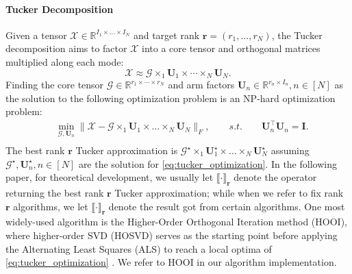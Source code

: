 \paragraph{Tucker Decomposition}
Given a tensor $\mathscr{X}\in\mathbb{R}^{I_1\times \dots \times I_N}$ and target rank $\mathbf{r}=(r_1,\dots, r_N)$, the Tucker decomposition aims to factor $\mathscr{X}$ into a core tensor and orthogonal matrices multiplied along each mode:
\begin{equation}
\label{eq:tucker_optimization}
\mathscr{X} \approx \mathscr{G}\times_1 \mathbf{U}_1 \times \cdots \times_N \mathbf{U}_N.  
\end{equation}
Finding the core tensor $\mathscr{G}\in \mathbb{R}^{r_1 \times \cdots \times r_N}$ and arm factors $\mathbf{U}_n \in \mathbb{R}^{r_n\times I_n}, n\in [N]$ as the solution to the following optimization problem is an NP-hard optimization problem: 
\begin{equation}
\begin{aligned}
\label{eq:tucker_optimization}
&\min_{\mathscr{G}, \mathbf{U}_n}\|\mathscr{X} - \mathscr{G}\times_1 \mathbf{U}_1\times \dots \times_N \mathbf{U}_N\|_F, \qquad s.t. \qquad \mathbf{U}_n^\top \mathbf{U}_n = \mathbf{I}. \\
\end{aligned}
\end{equation}
The best rank $\mathbf{r}$ Tucker approximation is $\mathscr{G}^\star\times_1 \mathbf{U}_1^\star\times \dots \times_N \mathbf{U}_N^\star$ assuming $\mathscr{G}^\star, \mathbf{U}_n^\star, n\in [N]$ are the solution for \eqref{eq:tucker_optimization}. In the following paper, for theoretical development, we usually let $\llbracket \cdot \rrbracket_\mathbf{r}$ denote the operator returning the best rank $\mathbf{r}$ Tucker approximation; while when we refer to fix rank $\mathbf{r}$ algorithms, we let $\llbracket \cdot \rrbracket_\mathbf{r}$ denote the result got from certain algorithms. One most widely-used algorithm is the Higher-Order Orthogonal Iteration method (HOOI)\citep{de2000multilinear}, where higher-order SVD (HOSVD) serves as  the starting point before applying the Alternating Least Squares (ALS) to reach a local optima of \eqref{eq:tucker_optimization} \citep{kroonenberg1980principal}. We refer to HOOI in our algorithm implementation. 
\par 


